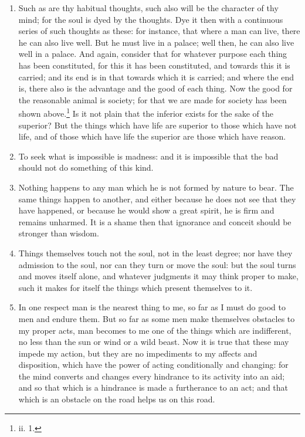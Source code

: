 \begin{enumerate}
\item Such as are thy habitual thoughts, such also will be the character of thy mind; for the soul is dyed by the thoughts. Dye it then with a continuous series of such thoughts as these: for instance, that where a man can live, there he can also live well. But he must live in a palace; well then, he can also live well in a palace. And again, consider that for whatever purpose each thing has been constituted, for this it has been constituted, and towards this it is carried; and its end is in that towards which it is carried; and where the end is, there also is the advantage and the good of each thing. Now the good for the reasonable animal is society; for that we are made for society has been shown above.\footnote{ii. 1.} Is it not plain that the inferior exists for the sake of the superior? But the things which have life are superior to those which have not life, and of those which have life the superior are those which have reason.

\item To seek what is impossible is madness: and it is impossible that the bad should not do something of this kind.

\item Nothing happens to any man which he is not formed by nature to bear. The same things happen to another, and either because he does not see that they have happened, or because he would show a great spirit, he is firm and remains unharmed. It is a shame then that ignorance and conceit should be stronger than wisdom.

\item Things themselves touch not the soul, not in the least degree; nor have they admission to the soul, nor can they turn or move the soul: but the soul turns and moves itself alone, and whatever judgments it may think proper to make, such it makes for itself the things which present themselves to it.

\item In one respect man is the nearest thing to me, so far as I must do good to men and endure them. But so far as some men make themselves obstacles to my proper acts, man becomes to me one of the things which are indifferent, no less than the sun or wind or a wild beast. Now it is true that these may impede my action, but they are no impediments to my affects and disposition, which have the power of acting conditionally and changing: for the mind converts and changes every hindrance to its activity into an aid; and so that which is a hindrance is made a furtherance to an act; and that which is an obstacle on the road helps us on this road.


\end{enumerate}
